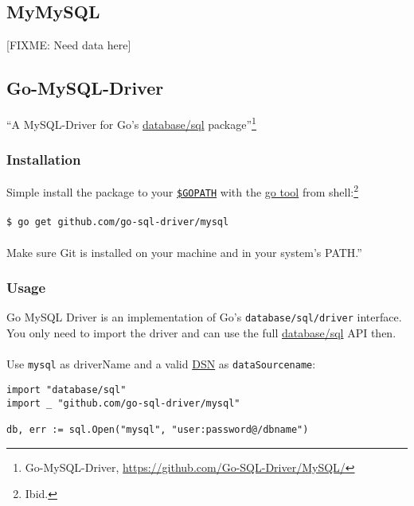 \documentclass[12pt,letterpaper,dvips]{article}
\newcommand{\FIXME}[1]{\textsf{[FIXME: #1]}}
\begin{document}
\subsection{MyMySQL}
\FIXME{Need data here}


\subsection{Go-MySQL-Driver}
``A MySQL-Driver for Go's
\href{http://golang.org/pkg/database/sql}{database/sql}
package''\footnote{Go-MySQL-Driver, \href{https://github.com/Go-SQL-Driver/MySQL/}{https://github.com/Go-SQL-Driver/MySQL/}}

\subsubsection{Installation}
Simple install the package to your
\texttt{\href{http://code.google.com/p/go-wiki/wiki/GOPATH}{\$GOPATH}}
with the \href{http://golang.org/cmd/go/}{go tool} from
shell:\footnote{Ibid.}\\
\\
\texttt{\$ go get github.com/go-sql-driver/mysql}\\
\\
\noindent Make sure Git is installed on your machine and in your
system's PATH.''

\subsubsection{Usage}
Go MySQL Driver is an implementation of Go's
\texttt{database/sql/driver} interface.  You only need to
import the driver and can use the full
\href{http://golang.org/pkg/database/sql}{database/sql}
API then.\\
\\
Use \texttt{mysql} as driverName and a valid
\href{https://github.com/Go-SQL-Driver/MySQL/\#dsn-data-source-name}{DSN}
as \texttt{dataSourcename}:

\begin{verbatim}
import "database/sql"
import _ "github.com/go-sql-driver/mysql"

db, err := sql.Open("mysql", "user:password@/dbname")
\end{verbatim}
\end{document}
